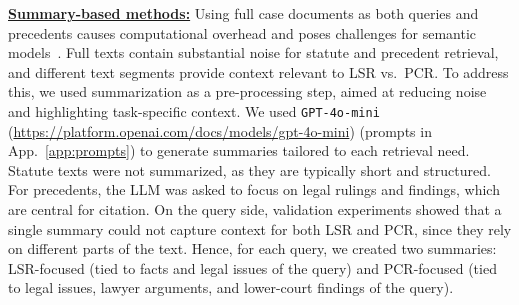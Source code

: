 \vspace{1mm}
\noindent\underline{\textbf{Summary-based methods:}} 
Using full case documents as both queries and precedents causes computational overhead and poses challenges for semantic models~\citep{tang2024caselink,tang2024casegnn++,qin2024ljpretrieval,yue2024eventcourtview}. Full texts contain substantial noise for statute and precedent retrieval, and different text segments provide context relevant to LSR vs.\ PCR. To address this, we used summarization as a pre-processing step, aimed at reducing noise and highlighting task-specific context. We used \texttt{GPT-4o-mini} (\url{https://platform.openai.com/docs/models/gpt-4o-mini}) (prompts in App.~\ref{app:prompts}) to generate summaries tailored to each retrieval need. Statute texts were not summarized, as they are typically short and structured. For precedents, the LLM was asked to focus on legal rulings and findings, which are central for citation. On the query side, validation experiments showed that a single summary could not capture context for both LSR and PCR, since they rely on different parts of the text. Hence, for each query, we created two summaries: LSR-focused (tied to facts and legal issues of the query) and PCR-focused (tied to legal issues, lawyer arguments, and lower-court findings of the query). 
